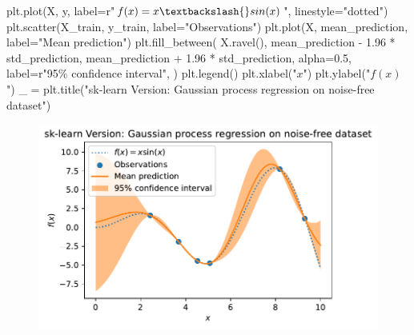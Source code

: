 \documentclass[
  letterpaper,
  DIV=11,
  numbers=noendperiod]{scrreprt}
\newenvironment{Shaded}{\begin{snugshade}}{\end{snugshade}}
\newcommand{\FloatTok}[1]{\textcolor[rgb]{0.68,0.00,0.00}{#1}}
\newcommand{\NormalTok}[1]{\textcolor[rgb]{0.00,0.23,0.31}{#1}}
\newcommand{\OperatorTok}[1]{\textcolor[rgb]{0.37,0.37,0.37}{#1}}
\newcommand{\SpecialCharTok}[1]{\textcolor[rgb]{0.37,0.37,0.37}{#1}}
\newcommand{\StringTok}[1]{\textcolor[rgb]{0.13,0.47,0.30}{#1}}
\newcommand{\VerbatimStringTok}[1]{\textcolor[rgb]{0.13,0.47,0.30}{#1}}
\begin{document}
\begin{Shaded}
\begin{Highlighting}[]
\NormalTok{plt.plot(X, y, label}\OperatorTok{=}\VerbatimStringTok{r"$f(x) = x \textbackslash{}sin(x)$"}\NormalTok{, linestyle}\OperatorTok{=}\StringTok{"dotted"}\NormalTok{)}
\NormalTok{plt.scatter(X\_train, y\_train, label}\OperatorTok{=}\StringTok{"Observations"}\NormalTok{)}
\NormalTok{plt.plot(X, mean\_prediction, label}\OperatorTok{=}\StringTok{"Mean prediction"}\NormalTok{)}
\NormalTok{plt.fill\_between(}
\NormalTok{    X.ravel(),}
\NormalTok{    mean\_prediction }\OperatorTok{{-}} \FloatTok{1.96} \OperatorTok{*}\NormalTok{ std\_prediction,}
\NormalTok{    mean\_prediction }\OperatorTok{+} \FloatTok{1.96} \OperatorTok{*}\NormalTok{ std\_prediction,}
\NormalTok{    alpha}\OperatorTok{=}\FloatTok{0.5}\NormalTok{,}
\NormalTok{    label}\OperatorTok{=}\VerbatimStringTok{r"95}\SpecialCharTok{\% c}\VerbatimStringTok{onfidence interval"}\NormalTok{,}
\NormalTok{)}
\NormalTok{plt.legend()}
\NormalTok{plt.xlabel(}\StringTok{"$x$"}\NormalTok{)}
\NormalTok{plt.ylabel(}\StringTok{"$f(x)$"}\NormalTok{)}
\NormalTok{\_ }\OperatorTok{=}\NormalTok{ plt.title(}\StringTok{"sk{-}learn Version: Gaussian process regression on noise{-}free dataset"}\NormalTok{)}
\end{Highlighting}
\end{Shaded}

\begin{figure}[H]

{\centering \includegraphics{07_spot_ei_files/figure-pdf/cell-25-output-1.pdf}

}

\end{figure}
\end{document}
